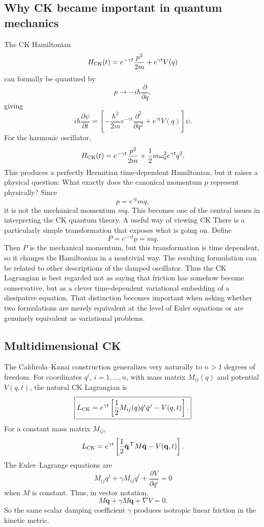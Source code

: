 \subsection{ Why CK became important in quantum mechanics}
The CK Hamiltonian
$$ H_{\rm CK}(t) = e^{-\gamma t}\frac{p^2}{2m} + e^{\gamma t}V(q) $$
can formally be quantized by
$$ p\longrightarrow -i\hbar\frac{\partial}{\partial q}, $$
giving
$$ i\hbar\frac{\partial\psi}{\partial t} = \left[ -\frac{\hbar^2}{2m}e^{-\gamma t}\frac{\partial^2}{\partial q^2} + e^{\gamma t}V(q) \right]\psi. $$
For the harmonic oscillator,
$$ H_{\rm CK}(t) = e^{-\gamma t}\frac{p^2}{2m} + \frac12m\omega_0^2e^{\gamma t}q^2. $$
This produces a perfectly Hermitian time-dependent Hamiltonian, but it raises a physical question:
What exactly does the canonical momentum \(p\) represent physically?
Since
$$ p=e^{\gamma t}m\dot q, $$
it is not the mechanical momentum \(m\dot q\). This becomes one of the central issues in interpreting the CK quantum theory.
A useful way of viewing CK
There is a particularly simple transformation that exposes what is going on. Define
$$ P=e^{-\gamma t}p=m\dot q. $$
Then \(P\) is the mechanical momentum, but this transformation is time dependent, so it changes the Hamiltonian in a nontrivial way. The resulting formulation can be related to other descriptions of the damped oscillator.
Thus the CK Lagrangian is best regarded not as saying that friction has somehow become conservative, but as a clever time-dependent variational embedding of a dissipative equation.
That distinction becomes important when asking whether two formulations are merely equivalent at the level of Euler equations or are genuinely equivalent as variational problems.

\subsection{Multidimensional CK}
The Caldirola–Kanai construction generalizes very naturally to \(n>1\) degrees of freedom.
For coordinates \(q^i\), \(i=1,\ldots,n\), with mass matrix \(M_{ij}(q)\) and potential \(V(q,t)\), the natural CK Lagrangian is
$$ \boxed{ L_{\rm CK} = e^{\gamma t} \left[ \frac12 M_{ij}(q)\dot q^i\dot q^j - V(q,t) \right]. } $$
For a constant mass matrix \(M_{ij}\),
$$ L_{\rm CK} = e^{\gamma t} \left[ \frac12\dot{\mathbf q}^{\,T}M\dot{\mathbf q} - V(\mathbf q,t) \right]. $$
The Euler–Lagrange equations are
$$ \boxed{ M_{ij}\ddot q^j + \gamma M_{ij}\dot q^j + \frac{\partial V}{\partial q^i} =0 } $$
when \(M\) is constant.
Thus, in vector notation,
$$ \boxed{ M\ddot{\mathbf q} +\gamma M\dot{\mathbf q} +\nabla V=0. } $$
So the same scalar damping coefficient \(\gamma\) produces isotropic linear friction in the kinetic metric.

